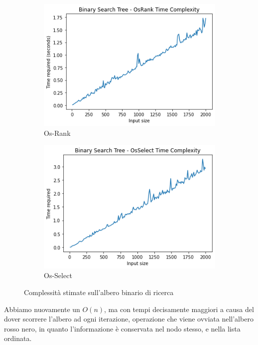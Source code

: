     \begin{figure}[H]
        \centering
        \begin{subfigure}[H]{0.4\textwidth}
            \centering
            \includegraphics[width=1\textwidth]{Images/BST-RANK.png}
            \caption{Os-Rank}
        \end{subfigure}
        \begin{subfigure}[H]{0.4\textwidth}
            \centering
            \includegraphics[width=1\textwidth]{Images/BST-SELECT.png}
            \caption{Os-Select}
        \end{subfigure}
    \caption{Complessità stimate sull'albero binario di ricerca}
    \end{figure}

    Abbiamo nuovamente un $O(n)$, ma con tempi decisamente maggiori a causa del dover scorrere l'albero ad ogni iterazione, operazione che viene ovviata nell'albero rosso nero, in quanto l'informazione è conservata nel nodo stesso, e nella lista ordinata. 

